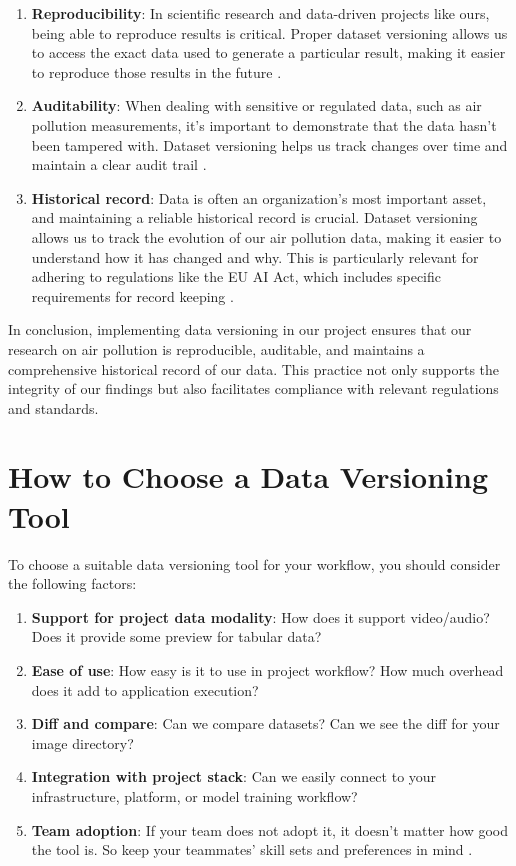 \begin{enumerate}[label=\textbf{\arabic{*}.}]
	\item \textbf{Reproducibility}: In scientific research and data-driven projects
	like ours, being able to reproduce results is critical. Proper dataset versioning
	allows us to access the exact data used to generate a particular result,
	making it easier to reproduce those results in the future \cite{DVC:2023}.
	
	\item \textbf{Auditability}: When dealing with sensitive or regulated data,
	such as air pollution measurements, it’s important to demonstrate that the data
	hasn’t been tampered with. Dataset versioning helps us track changes over
	time and maintain a clear audit trail \cite{DVC:2023}.
	
	\item \textbf{Historical record}: Data is often an organization’s most important
	asset, and maintaining a reliable historical record is crucial. Dataset versioning
	allows us to track the evolution of our air pollution data, making it easier
	to understand how it has changed and why. This is particularly relevant for adhering
	to regulations like the EU AI Act, which includes specific requirements for
	record keeping \cite{DVC:2023}.
\end{enumerate}

In conclusion, implementing data versioning in our project ensures that our
research on air pollution is reproducible, auditable, and maintains a
comprehensive historical record of our data. This practice not only supports the
integrity of our findings but also facilitates compliance with relevant regulations
and standards.

\section{How to Choose a Data Versioning Tool}

To choose a suitable data versioning tool for your workflow, you should consider
the following factors:

\begin{enumerate}
	\item \textbf{Support for project data modality}: How does it support video/audio?
	Does it provide some preview for tabular data?	
	\item \textbf{Ease of use}: How easy is it to use in project workflow? How
	much overhead does it add to application execution?
	\item \textbf{Diff and compare}: Can we compare datasets? Can we see the diff
	for your image directory?
	\item \textbf{Integration with project stack}: Can we easily connect to your infrastructure,
	platform, or model training workflow?
	\item \textbf{Team adoption}: If your team does not adopt it, it doesn’t
	matter how good the tool is. So keep your teammates' skill sets and
	preferences in mind \cite{DVCTools:2023}.
\end{enumerate}
